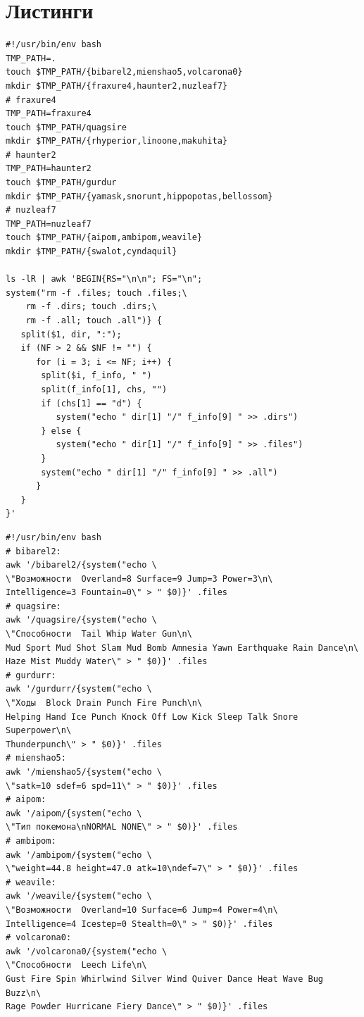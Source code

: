 \documentclass[11pt]{article}
\begin{document}
\section{Листинги}
\label{sec:orgf8bbaef}
\small
{}
\begin{lstlisting}
#!/usr/bin/env bash
TMP_PATH=.
touch $TMP_PATH/{bibarel2,mienshao5,volcarona0}
mkdir $TMP_PATH/{fraxure4,haunter2,nuzleaf7}
# fraxure4
TMP_PATH=fraxure4
touch $TMP_PATH/quagsire
mkdir $TMP_PATH/{rhyperior,linoone,makuhita}
# haunter2
TMP_PATH=haunter2
touch $TMP_PATH/gurdur
mkdir $TMP_PATH/{yamask,snorunt,hippopotas,bellossom}
# nuzleaf7
TMP_PATH=nuzleaf7
touch $TMP_PATH/{aipom,ambipom,weavile}
mkdir $TMP_PATH/{swalot,cyndaquil}

ls -lR | awk 'BEGIN{RS="\n\n"; FS="\n";
system("rm -f .files; touch .files;\
	rm -f .dirs; touch .dirs;\
	rm -f .all; touch .all")} {
   split($1, dir, ":");
   if (NF > 2 && $NF != "") {
      for (i = 3; i <= NF; i++) {
	   split($i, f_info, " ")
	   split(f_info[1], chs, "")
	   if (chs[1] == "d") {
	      system("echo " dir[1] "/" f_info[9] " >> .dirs")
	   } else {
	      system("echo " dir[1] "/" f_info[9] " >> .files")
	   }
	   system("echo " dir[1] "/" f_info[9] " >> .all")
      }
   }
}'
\end{lstlisting}
\vspace{2em}
\begin{lstlisting}
#!/usr/bin/env bash
# bibarel2:
awk '/bibarel2/{system("echo \
\"Возможности  Overland=8 Surface=9 Jump=3 Power=3\n\
Intelligence=3 Fountain=0\" > " $0)}' .files
# quagsire:
awk '/quagsire/{system("echo \
\"Способности  Tail Whip Water Gun\n\
Mud Sport Mud Shot Slam Mud Bomb Amnesia Yawn Earthquake Rain Dance\n\
Haze Mist Muddy Water\" > " $0)}' .files
# gurdurr:
awk '/gurdurr/{system("echo \
\"Ходы  Block Drain Punch Fire Punch\n\
Helping Hand Ice Punch Knock Off Low Kick Sleep Talk Snore Superpower\n\
Thunderpunch\" > " $0)}' .files
# mienshao5:
awk '/mienshao5/{system("echo \
\"satk=10 sdef=6 spd=11\" > " $0)}' .files
# aipom:
awk '/aipom/{system("echo \
\"Тип покемона\nNORMAL NONE\" > " $0)}' .files
# ambipom:
awk '/ambipom/{system("echo \
\"weight=44.8 height=47.0 atk=10\ndef=7\" > " $0)}' .files
# weavile:
awk '/weavile/{system("echo \
\"Возможности  Overland=10 Surface=6 Jump=4 Power=4\n\
Intelligence=4 Icestep=0 Stealth=0\" > " $0)}' .files
# volcarona0:
awk '/volcarona0/{system("echo \
\"Способности  Leech Life\n\
Gust Fire Spin Whirlwind Silver Wind Quiver Dance Heat Wave Bug Buzz\n\
Rage Powder Hurricane Fiery Dance\" > " $0)}' .files
\end{lstlisting}
\end{document}
